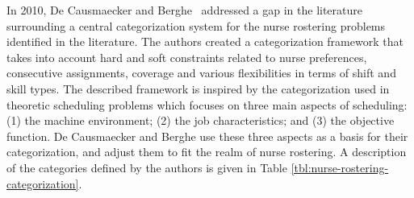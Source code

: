 
In 2010, De Causmaecker and Berghe~\cite{de_causmaecker_categorisation_2011} addressed a gap in the literature 
surrounding a central categorization system for the nurse rostering problems identified in the literature.
The authors created a categorization framework that takes into account
hard and soft constraints related to nurse preferences, consecutive
assignments, coverage and various flexibilities in terms of shift and 
skill types. The described framework is inspired by the categorization used
in theoretic scheduling problems which focuses on three main aspects of scheduling:
(1) the machine environment;
(2) the job characteristics;
and (3) the objective function.
De Causmaecker and Berghe use these three aspects as a basis for their categorization,
and adjust them to fit the realm of nurse rostering. A description of the categories defined
by the authors is given in Table \ref{tbl:nurse-rostering-categorization}.

